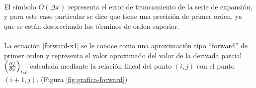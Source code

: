 \documentclass[letterpaper, openright, 12pt]{book}
\begin{document}
    \paragraph*{}
    El símbolo $O(\Delta x)$ representa el error de truncamiento de la serie de
    expansión, y para este caso particular se dice que tiene una precisión de
    primer orden, ya que se están despreciando los términos de orden superior.

    \paragraph*{}
    La ecuación \ref{forward-x1} se le conoce como una aproximación tipo
    ``forward'' de primer orden y representa el valor aproximado del valor de la
    derivada parcial $\left( \pdv{f}{x}\right)_{i,j}$ calculada mediante la
    relación lineal del punto $(i,j)$ con el punto $(i+1,j)$. (Figura \ref{fig:grafica-forward})
\end{document}
